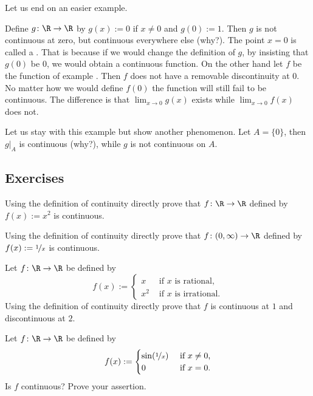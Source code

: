 \documentclass[12pt]{book}
\begin{document}
Let us end on an easier example.

\begin{example}
Define
$g \colon \R \to \R$ by $g(x) := 0$ if $x \not= 0$ and
$g(0) := 1$.
Then $g$ is not continuous at zero, but continuous everywhere else (why?).
The point $x=0$ is called a \emph{}.
That
is because if we would change the definition of $g$, by insisting that
$g(0)$ be $0$, we would obtain a continuous function.
On the other hand
let $f$ be the function of example .
Then $f$ does not have a
removable discontinuity at $0$.
No matter how we would define $f(0)$ the function
will still fail to be continuous.
The difference is that 
$\lim_{x\to 0} g(x)$ exists while
$\lim_{x\to 0} f(x)$ does not.

Let us stay with this example but show another phenomenon.
Let $A = \{ 0
\}$, then $g|_A$ is continuous (why?), while $g$ is not continuous on $A$.
\end{example}

\subsection*{Exercises}

\begin{exercise}
Using the definition of continuity directly prove that
$f \colon \R \to \R$ defined by
$f(x) := x^2$ is continuous.
\end{exercise}

\begin{exercise}
Using the definition of continuity directly prove that
$f \colon (0,\infty) \to \R$ defined by
$f(x) := \nicefrac{1}{x}$ is continuous.
\end{exercise}

\begin{exercise}
Let $f \colon \R \to \R$ be defined by
\begin{equation*}
f(x) :=
\begin{cases}
x & \text{ if $x$ is rational,} \\
x^2 & \text{ if $x$ is irrational.}
\end{cases}
\end{equation*}
Using the definition of continuity directly prove that
$f$ is continuous at $1$ and discontinuous at $2$.
\end{exercise}

\begin{exercise}
Let $f \colon \R \to \R$ be
defined by
\begin{equation*}
f(x) :=
\begin{cases}
\sin(\nicefrac{1}{x}) & \text{ if $x \not= 0$,} \\
0 & \text{ if $x=0$.}
\end{cases}
\end{equation*}
Is $f$ continuous?
  Prove your assertion.
\end{exercise}
\end{document}
